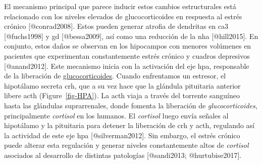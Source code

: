 \documentclass[
  11pt]{../MastersDoctoralThesisUNAM}
\begin{document}
El mecanismo principal que parece inducir estos cambios estructurales
está relacionado con los niveles elevados de glucocorticoides en
respuesta al estrés crónico {[}@conrad2008{]}. Estos pueden generar
atrofia de dendritas en \ac{ca}3 {[}@fuchs1998{]} y \ac{gd}
{[}@bessa2009{]}, así como una reducción de la \ac{nha} {[}@hill2015{]}.
En conjunto, estos daños se observan en los hipocampos con menores
volúmenes en pacientes que experimentan constantemente estrés crónico y
cuadros depresivos {[}@anand2012{]}. Este mecanismo inicia con la
activación del eje \ac{hpa}, responsable de la liberación de
\href{AppendixB.qmd\#term-id-32}{glucocorticoides}. Cuando enfrentamos
un estresor, el hipotálamo secreta \ac{crh}, que a su vez hace que la
glándula pituitaria anterior libere \ac{acth} (Figure~\ref{fig-HPA}). La
\ac{acth} viaja a través del torrente sanguíneo hasta las glándulas
suprarrenales, donde fomenta la liberación de \emph{glucocorticoides},
principalmente \emph{cortisol} en los humanos. El \emph{cortisol} luego
envía señales al hipotálamo y la pituitaria para detener la liberación
de \ac{crh} y \ac{acth}, regulando así la actividad de este eje \ac{hpa}
{[}@silverman2012{]}. Sin embargo, el estrés crónico puede alterar esta
regulación y generar niveles constantemente altos de \emph{cortisol}
asociados al desarrollo de distintas patologías {[}@sandi2013;
@hurtubise2017{]}.
\end{document}
